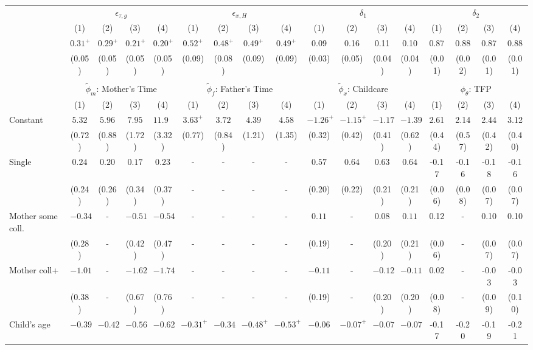 \begin{tabular}{lcccccccccccccccc}\\\toprule
 & \multicolumn{4}{c}{$\epsilon_{\tau,g}$} & \multicolumn{4}{c}{$\epsilon_{x,H}$} & \multicolumn{4}{c}{$\delta_{1}$} & \multicolumn{4}{c}{$\delta_{2}$} \\
&(1)&(2)&(3)&(4)&(1)&(2)&(3)&(4)&(1)&(2)&(3)&(4)&(1)&(2)&(3)&(4)\\\cmidrule(r){2-5}\cmidrule(r){6-9}\cmidrule(r){10-13}\cmidrule(r){14-17}
&$0.31^{+}$&$0.29^{+}$&$0.21^{+}$&$0.20^{+}$&$0.52^{+}$&$0.48^{+}$&$0.49^{+}$&$0.49^{+}$&0.09&0.16&0.11&0.10&0.87&0.88&0.87&0.88\\
&(0.05)&(0.05)&(0.05)&(0.05)&(0.09)&(0.08)&(0.09)&(0.09)&(0.03)&(0.05)&(0.04)&(0.04)&(0.01)&(0.02)&(0.01)&(0.01)\\
&&&&&&&&&&&&&&&&\\
 & \multicolumn{4}{c}{$\tilde{\phi}_{m}$: Mother's Time} & \multicolumn{4}{c}{$\tilde{\phi}_{f}$: Father's Time} & \multicolumn{4}{c}{$\tilde{\phi}_{x}$: Childcare} & \multicolumn{4}{c}{$\phi_{\theta}$: TFP} \\
&(1)&(2)&(3)&(4)&(1)&(2)&(3)&(4)&(1)&(2)&(3)&(4)&(1)&(2)&(3)&(4)\\\cmidrule(r){2-5}\cmidrule(r){6-9}\cmidrule(r){10-13}\cmidrule(r){14-17}
Constant&$5.32$&$5.96$&$7.95$&$11.99$&$3.63^{+}$&$3.72$&$4.39$&$4.58$&$-1.26^{+}$&$-1.15^{+}$&$-1.17$&$-1.39$&2.61&2.14&2.44&3.12\\
&(0.72)&(0.88)&(1.72)&(3.32)&(0.77)&(0.84)&(1.21)&(1.35)&(0.32)&(0.42)&(0.41)&(0.62)&(0.44)&(0.57)&(0.42)&(0.40)\\
Single&$0.24$&$0.20$&$0.17$&$0.23$&-&-&-&-&$0.57$&$0.64$&$0.63$&$0.64$&-0.17&-0.16&-0.18&-0.16\\
&(0.24)&(0.26)&(0.34)&(0.37)&-&-&-&-&(0.20)&(0.22)&(0.21)&(0.21)&(0.06)&(0.08)&(0.07)&(0.07)\\
Mother some coll.&$-0.34$&-&$-0.51$&$-0.54$&-&-&-&-&$0.11$&-&$0.08$&$0.11$&0.12&-&0.10&0.10\\
&(0.28)&-&(0.42)&(0.47)&-&-&-&-&(0.19)&-&(0.20)&(0.21)&(0.06)&-&(0.07)&(0.07)\\
Mother coll+&$-1.01$&-&$-1.62$&$-1.74$&-&-&-&-&$-0.11$&-&$-0.12$&$-0.11$&0.02&-&-0.03&-0.03\\
&(0.38)&-&(0.67)&(0.76)&-&-&-&-&(0.19)&-&(0.20)&(0.20)&(0.08)&-&(0.09)&(0.10)\\
Child's age&$-0.39$&$-0.42$&$-0.56$&$-0.62$&$-0.31^{+}$&$-0.34$&$-0.48^{+}$&$-0.53^{+}$&$-0.06$&$-0.07^{+}$&$-0.07$&$-0.07$&-0.17&-0.20&-0.19&-0.21\\

\end{tabular}
